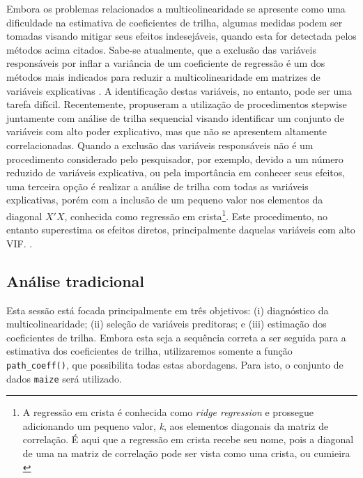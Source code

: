 \documentclass[
]{book}
\begin{document}
Embora os problemas relacionados a multicolinearidade  se apresente como uma dificuldade na estimativa de coeficientes de trilha, algumas medidas podem ser tomadas visando mitigar seus efeitos indesejáveis, quando esta for detectada pelos métodos acima citados. Sabe-se atualmente, que a exclusão das variáveis responsáveis por inflar a variância de um coeficiente de regressão é um dos métodos mais indicados para reduzir a multicolinearidade em matrizes de variáveis explicativas \citep{Olivoto2017f}. A identificação destas variáveis, no entanto, pode ser uma tarefa difícil. Recentemente, \citet{Olivoto2017} propuseram a utilização de procedimentos stepwise  juntamente com análise de trilha sequencial visando identificar um conjunto de variáveis com alto poder explicativo, mas que não se apresentem altamente correlacionadas. Quando a exclusão das variáveis responsáveis não é um procedimento considerado pelo pesquisador, por exemplo, devido a um número reduzido de variáveis explicativa, ou pela importância em conhecer seus efeitos, uma terceira opção é realizar a análise de trilha com todas as variáveis explicativas, porém com a inclusão de um pequeno valor nos elementos da diagonal \(X'X\), conhecida como regressão em crista\footnote{A regressão em crista é conhecida como \emph{ridge regression} e prossegue adicionando um pequeno valor, \emph{k}, aos elementos diagonais da matriz de correlação. É aqui que a regressão em crista recebe seu nome, pois a diagonal de uma na matriz de correlação pode ser vista como uma crista, ou cumieira \citep{Hoerl1976}}. Este procedimento, no entanto superestima os efeitos diretos, principalmente daquelas variáveis com alto VIF. \citep{Olivoto2017f}.

\hypertarget{anuxe1lise-tradicional}{%
\subsection{Análise tradicional}\label{anuxe1lise-tradicional}}

Esta sessão está focada principalmente em três objetivos: (i) diagnóstico da multicolinearidade; (ii) seleção de variáveis  preditoras; e (iii) estimação dos coeficientes de trilha. Embora esta seja a sequência correta a ser seguida para a estimativa dos coeficientes de trilha, utilizaremos somente a função \texttt{path\_coeff()},  que possibilita todas estas abordagens. Para isto, o conjunto de dados \texttt{maize} será utilizado.
\end{document}
